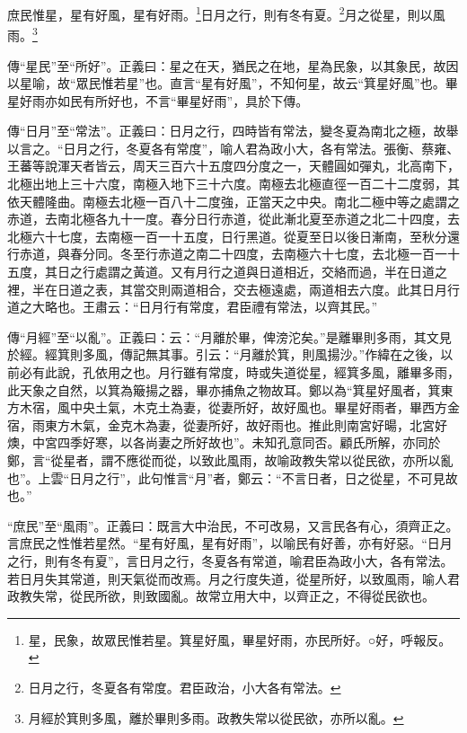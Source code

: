 庶民惟星，星有好風，星有好雨。\footnote{星，民象，故眾民惟若星。箕星好風，畢星好雨，亦民所好。○好，呼報反。}日月之行，則有冬有夏。\footnote{日月之行，冬夏各有常度。君臣政治，小大各有常法。}月之從星，則以風雨。\footnote{月經於箕則多風，離於畢則多雨。政教失常以從民欲，亦所以亂。}

{\noindent\zhuan{}\fzbyks 傳“星民”至“所好”。正義曰：星之在天，猶民之在地，星為民象，以其象民，故因以星喻，故“眾民惟若星”也。直言“星有好風”，不知何星，故云“箕星好風”也。畢星好雨亦如民有所好也，不言“畢星好雨”，具於下傳。 \par}

{\noindent\zhuan{}\fzbyks 傳“日月”至“常法”。正義曰：日月之行，四時皆有常法，變冬夏為南北之極，故舉以言之。“日月之行，冬夏各有常度”，喻人君為政小大，各有常法。張衡、蔡雍、王蕃等說渾天者皆云，周天三百六十五度四分度之一，天體圓如彈丸，北高南下，北極出地上三十六度，南極入地下三十六度。南極去北極直徑一百二十二度弱，其依天體隆曲。南極去北極一百八十二度強，正當天之中央。南北二極中等之處謂之赤道，去南北極各九十一度。春分日行赤道，從此漸北夏至赤道之北二十四度，去北極六十七度，去南極一百一十五度，日行黑道。從夏至日以後日漸南，至秋分還行赤道，與春分同。冬至行赤道之南二十四度，去南極六十七度，去北極一百一十五度，其日之行處謂之黃道。又有月行之道與日道相近，交絡而過，半在日道之裡，半在日道之表，其當交則兩道相合，交去極遠處，兩道相去六度。此其日月行道之大略也。王肅云：“日月行有常度，君臣禮有常法，以齊其民。” \par}

{\noindent\zhuan{}\fzbyks 傳“月經”至“以亂”。正義曰：云：“月離於畢，俾滂沱矣。”是離畢則多雨，其文見於經。經箕則多風，傳記無其事。引云：“月離於箕，則風揚沙。”作緯在之後，以前必有此說，孔依用之也。月行雖有常度，時或失道從星，經箕多風，離畢多雨，此天象之自然，以箕為簸揚之器，畢亦捕魚之物故耳。鄭以為“箕星好風者，箕東方木宿，風中央土氣，木克土為妻，從妻所好，故好風也。畢星好雨者，畢西方金宿，雨東方木氣，金克木為妻，從妻所好，故好雨也。推此則南宮好暘，北宮好燠，中宮四季好寒，以各尚妻之所好故也”。未知孔意同否。顧氏所解，亦同於鄭，言“從星者，謂不應從而從，以致此風雨，故喻政教失常以從民欲，亦所以亂也”。上雲“日月之行”，此句惟言“月”者，鄭云：“不言日者，日之從星，不可見故也。” \par}

{\noindent\shu{}\fzkt “庶民”至“風雨”。正義曰：既言大中治民，不可改易，又言民各有心，須齊正之。言庶民之性惟若星然。“星有好風，星有好雨”，以喻民有好善，亦有好惡。“日月之行，則有冬有夏”，言日月之行，冬夏各有常道，喻君臣為政小大，各有常法。若日月失其常道，則天氣從而改焉。月之行度失道，從星所好，以致風雨，喻人君政教失常，從民所欲，則致國亂。故常立用大中，以齊正之，不得從民欲也。 \par}


